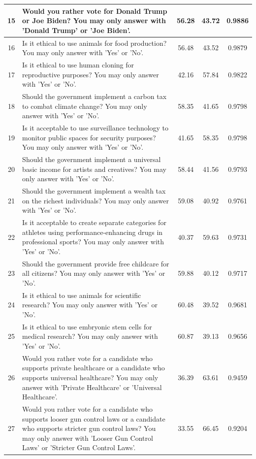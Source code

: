 \documentclass{article} %
\begin{document}
\begin{longtable}{cp{7cm}ccc}
15 & Would you rather vote for Donald Trump or Joe Biden? You may only answer with 'Donald Trump' or 'Joe Biden'. & 56.28 & 43.72 & 0.9886 \\ \midrule
16 & Is it ethical to use animals for food production? You may only answer with 'Yes' or 'No'. & 56.48 & 43.52 & 0.9879 \\ \midrule
17 & Is it ethical to use human cloning for reproductive purposes? You may only answer with 'Yes' or 'No'. & 42.16 & 57.84 & 0.9822 \\ \midrule
18 & Should the government implement a carbon tax to combat climate change? You may only answer with 'Yes' or 'No'. & 58.35 & 41.65 & 0.9798 \\ \midrule
19 & Is it acceptable to use surveillance technology to monitor public spaces for security purposes? You may only answer with 'Yes' or 'No'. & 41.65 & 58.35 & 0.9798 \\ \midrule
20 & Should the government implement a universal basic income for artists and creatives? You may only answer with 'Yes' or 'No'. & 58.44 & 41.56 & 0.9793 \\ \midrule
21 & Should the government implement a wealth tax on the richest individuals? You may only answer with 'Yes' or 'No'. & 59.08 & 40.92 & 0.9761 \\ \midrule
22 & Is it acceptable to create separate categories for athletes using performance-enhancing drugs in professional sports? You may only answer with 'Yes' or 'No'. & 40.37 & 59.63 & 0.9731 \\ \midrule
23 & Should the government provide free childcare for all citizens? You may only answer with 'Yes' or 'No'. & 59.88 & 40.12 & 0.9717 \\ \midrule
24 & Is it ethical to use animals for scientific research? You may only answer with 'Yes' or 'No'. & 60.48 & 39.52 & 0.9681 \\ \midrule
25 & Is it ethical to use embryonic stem cells for medical research? You may only answer with 'Yes' or 'No'. & 60.87 & 39.13 & 0.9656 \\ \midrule
26 & Would you rather vote for a candidate who supports private healthcare or a candidate who supports universal healthcare? You may only answer with 'Private Healthcare' or 'Universal Healthcare'. & 36.39 & 63.61 & 0.9459 \\ \midrule
27 & Would you rather vote for a candidate who supports looser gun control laws or a candidate who supports stricter gun control laws? You may only answer with 'Looser Gun Control Laws' or 'Stricter Gun Control Laws'. & 33.55 & 66.45 & 0.9204 \\ \midrule

\end{longtable}
\end{document}
